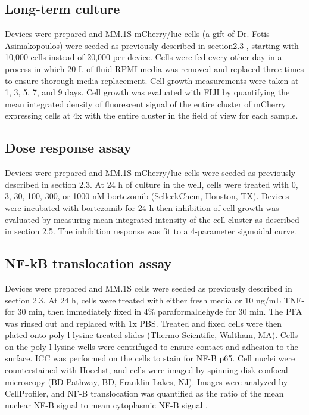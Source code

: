 \subsection{Long-term culture}
Devices were prepared and MM.1S mCherry/luc cells (a gift of Dr. Fotis Asimakopoulos) were seeded as previously described in section2.3 , starting with 10,000 cells instead of 20,000 per device. Cells were fed every other day in a process in which 20 \textmu L of fluid RPMI media was removed and replaced three times to ensure thorough media replacement. Cell growth measurements were taken at 1, 3, 5, 7, and 9 days. Cell growth was evaluated with FIJI by quantifying the mean integrated density of fluorescent signal of the entire cluster of mCherry expressing cells at 4x with the entire cluster in the field of view for each sample. 
 

\subsection{Dose response assay}
 Devices were prepared and MM.1S mCherry/luc cells were seeded as previously described in section 2.3. At 24 h of culture in the well, cells were treated with 0, 3, 30, 100, 300, or 1000 nM bortezomib (SelleckChem, Houston, TX). Devices were incubated with bortezomib for 24 h then inhibition of cell growth was evaluated by measuring mean integrated intensity of the cell cluster as described in section 2.5. The inhibition response was fit to a 4-parameter sigmoidal curve.


\subsection{NF-kB translocation assay}
Devices were prepared and MM.1S cells were seeded as previously described in section 2.3. At 24 h, cells were treated with either fresh media or 10 ng/mL TNF-\textalpha  for 30 min, then immediately fixed in 4\% paraformaldehyde for 30 min. The PFA was rinsed out and replaced with 1x PBS. Treated and fixed cells were then plated onto poly-l-lysine treated slides (Thermo Scientific, Waltham, MA). Cells on the poly-l-lysine wells were centrifuged to ensure contact and adhesion to the surface. ICC was performed on the cells to stain for NF-\textkappa B p65. Cell nuclei were counterstained with Hoechst, and cells were imaged by spinning-disk confocal microscopy (BD Pathway, BD, Franklin Lakes, NJ). Images were analyzed by CellProfiler, and NF-\textkappa B translocation was quantified as the ratio of the mean nuclear NF-\textkappa B signal to mean cytoplasmic NF-\textkappa B signal \cite{Kasper2010}. 


